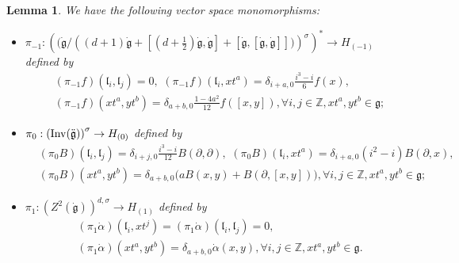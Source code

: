 \documentclass[1p]{elsarticle}
\numberwithin{equation}{section}
\def\dg{\dot{\mathfrak{g}}}
\def\fg{\mathfrak{g}}
\def\bZ{\mathbb{Z}}
\def\Inv{{\rm Inv}}
\def\fl{\mathfrak{l}}
\newtheorem{lemm}[theo]{Lemma}
\begin{document}
\begin{lemm} \label{lemm-8}We have the following vector space monomorphisms:
\begin{itemize}
	\item[(1).]
 $\pi_{-1}: \left (\Big (\dg\Big/\left ((d+1)\dg+[(d+\frac 12)\dg,\dg]+[\dg,[\dg,\dg]]\Big)\right)^{\sigma}\right)^*\rightarrow H_{(-1)}$ defined by
\begin{equation}\label{Eq2.12}\begin{aligned}&(\pi_{-1}f)(\fl_i,\fl_j)=0, \,\,(\pi_{-1}f)(\fl_i,xt^a)=\delta_{i+a,0}\frac{i^3-i}6 f(x),\\ &(\pi_{-1}f)(xt^a,yt^{b})=\delta_{a+b,0}\frac{1-4a^2}{12}f([x,y]),\forall i,j\in \bZ, xt^a,yt^b\in \fg;\end{aligned}\end{equation}

	\item[(2).]$\pi_0: {(\Inv(\ddot{\fg}))}^\sigma \rightarrow H_{(0)}$ defined by
\begin{equation}\label{Eq2.13}\begin{aligned}&(\pi_0B)(\fl_i,\fl_j)=\delta_{i+j,0}\frac{i^3-i}{12} B(\partial,\partial),\,\,(\pi_0 B)(\fl_i,xt^a)=\delta_{i+a,0}(i^2-i) B(\partial,x),\\ &(\pi_0B)(xt^a,yt^b)=\delta_{a+b,0}\big(aB(x,y)+B(\partial,[x,y])\big),\forall i,j\in \bZ, xt^a,yt^b\in \fg;\end{aligned}\end{equation}


	\item[(3).] $\pi_{1}:(Z^2(\dg))^{d,\sigma} \rightarrow H_{(1)}$ defined by
\begin{equation}\label{Eq2.14}\begin{aligned}&(\pi_{1}\dot\alpha)(\fl_i,xt^j)=(\pi_1\dot\alpha)(\fl_i,\fl_j)=0,\\& (\pi_1\dot\alpha)(xt^a,yt^b)=\delta_{a+b,0}\dot\alpha(x,y),\forall i,j\in \bZ, xt^a,yt^b\in \fg.\end{aligned}\end{equation}\end{itemize}
\end{lemm}
\end{document}
